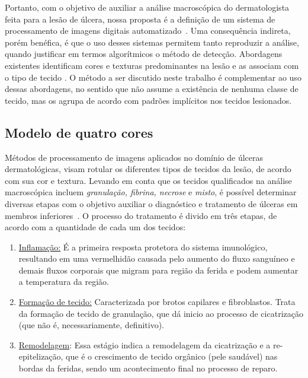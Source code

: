 Portanto, com o objetivo de auxiliar a análise macroscópica do dermatologista feita para a lesão de úlcera, nossa proposta é a definição de um sistema de processamento de imagens digitais automatizado~\cite{Gonzalez2008}.
Uma consequência indireta, porém benéfica, é que o uso desses sistemas permitem tanto reproduzir a análise, quando justificar em termos algorítmicos o método de detecção.
Abordagens existentes identificam cores e texturas predominantes na lesão e as associam com o tipo de tecido \cite{Chino2018,Blanco2016}.
O método a ser discutido neste trabalho é complementar ao uso dessas abordagens, no sentido que não assume a existência de nenhuma classe de tecido, mas os agrupa de acordo com padrões implícitos nos tecidos lesionados.


\subsection{Modelo de quatro cores}


Métodos de processamento de imagens aplicados no domínio de úlceras dermatológicas, visam rotular os diferentes tipos de tecidos da lesão, de acordo com sua cor e  textura.
Levando em conta que os tecidos qualificados na análise macroscópica incluem \textit{granulação, fibrina, necrose} e \textit{misto}, é possível determinar diversas etapas com o objetivo auxiliar o diagnóstico e tratamento de úlceras em membros inferiores~\cite{Blanco2016}. 
O processo do tratamento é divido em três etapas, de acordo com a quantidade de cada um dos tecidos:

\begin{enumerate}

\item \underline{Inflamação:} É a primeira resposta protetora do sistema imunológico, resultando em uma vermelhidão causada pelo aumento do fluxo sanguíneo e demais fluxos corporais que migram para região da ferida e podem aumentar a temperatura da região. 

\item \underline{Formação de tecido:} Caracterizada por brotos capilares e fibroblastos. 
Trata da formação de tecido de granulação, que dá inicio ao processo de cicatrização (que não é, necessariamente, definitivo). 

\item \underline{Remodelagem}: Essa estágio indica a remodelagem da cicatrização e a re-e\-pi\-te\-li\-za\-ção, que é o crescimento de tecido orgânico (pele saudável) nas bordas da feridas, sendo um acontecimento final no processo de reparo.

\end{enumerate}

